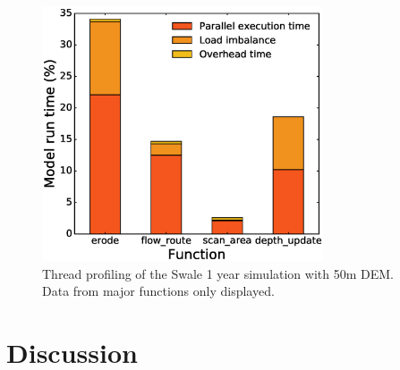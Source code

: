 \begin{figure}[t]
\includegraphics[width=8.3cm]{chp05_figures_scripts/fig_thread_profile.eps}
\caption{Thread profiling of the Swale 1 year simulation with 50m DEM. Data from major functions only displayed.}
\label{fig_thread_profile}
\end{figure}

%

\section{Discussion}


